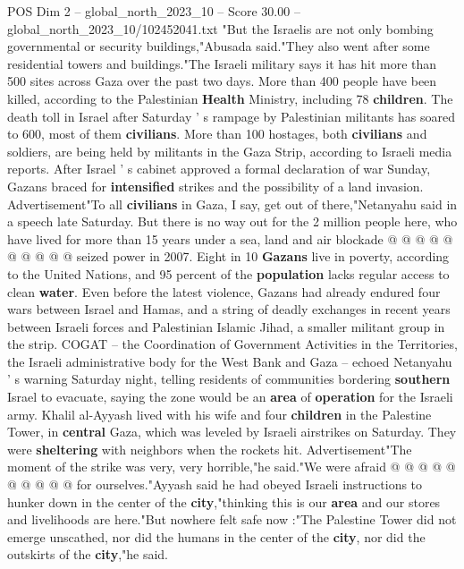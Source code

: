 \begin{textsample}{POS Dim 2 – global\_north\_2023\_10 – Score 30.00 – global\_north\_2023\_10/102452041.txt}  \label{ex:f2_pos_287}
"But the Israelis are not only bombing governmental or security buildings,"Abusada said."They also went after some residential towers and buildings."The Israeli military says it has hit more than 500 sites across Gaza over the past two days.
More than 400 people have been killed, according to the Palestinian \textbf{Health} Ministry, including 78 \textbf{children}.
The death toll in Israel after Saturday ' s rampage by Palestinian militants has soared to 600, most of them \textbf{civilians}.
More than 100 hostages, both \textbf{civilians} and soldiers, are being held by militants in the Gaza Strip, according to Israeli media reports.
After Israel ' s cabinet approved a formal declaration of war Sunday, Gazans braced for \textbf{intensified} strikes and the possibility of a land invasion.
Advertisement"To all \textbf{civilians} in Gaza, I say, get out of there,"Netanyahu said in a speech late Saturday.
But there is no way out for the 2 million people here, who have lived for more than 15 years under a sea, land and air blockade @ @ @ @ @ @ @ @ @ @ seized power in 2007.
Eight in 10 \textbf{Gazans} live in poverty, according to the United Nations, and 95 percent of the \textbf{population} lacks regular access to clean \textbf{water}.
Even before the latest violence, Gazans had already endured four wars between Israel and Hamas, and a string of deadly exchanges in recent years between Israeli forces and Palestinian Islamic Jihad, a smaller militant group in the strip.
COGAT -- the Coordination of Government Activities in the Territories, the Israeli administrative body for the West Bank and Gaza -- echoed Netanyahu ' s warning Saturday night, telling residents of communities bordering \textbf{southern} Israel to evacuate, saying the zone would be an \textbf{area} of \textbf{operation} for the Israeli army.
Khalil al-Ayyash lived with his wife and four \textbf{children} in the Palestine Tower, in \textbf{central} Gaza, which was leveled by Israeli airstrikes on Saturday.
They were \textbf{sheltering} with neighbors when the rockets hit.
Advertisement"The moment of the strike was very, very horrible,"he said."We were afraid @ @ @ @ @ @ @ @ @ @ for ourselves."Ayyash said he had obeyed Israeli instructions to hunker down in the center of the \textbf{city},"thinking this is our \textbf{area} and our stores and livelihoods are here."But nowhere felt safe now :"The Palestine Tower did not emerge unscathed, nor did the humans in the center of the \textbf{city}, nor did the outskirts of the \textbf{city},"he said.

\end{textsample}
